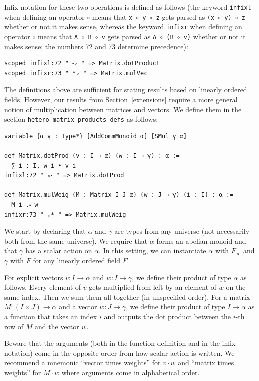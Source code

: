 \documentclass[]{article}
\renewcommand{\.}{\hskip .75pt}
\newcommand{\sekt}[1]{Section~\ref{#1}}
\let\r=\rightarrow
\let\*=\cdot
\begin{document}
Infix notation for these two operations is defined as follows
(the keyword \texttt{infixl} when defining an operator $\circ$ means that
\hbox{\texttt{x $\circ$ y $\circ$ z}} gets parsed as \texttt{(x $\circ$ y) $\circ$ z}
whether or not it makes sense, whereäs the keyword \texttt{infixr} when defining an operator $\circ$ means that %
\hbox{\texttt{A $\circ$ B $\circ$ v}} gets parsed as \texttt{A $\circ$ (B $\circ$ v)}
whether or not it makes sense; the numbers 72 and 73 determine precedence):
\begin{lstlisting}
scoped infixl:72 " ⬝ᵥ " => Matrix.dotProduct
scoped infixr:73 " *ᵥ " => Matrix.mulVec
\end{lstlisting}
The definitions above are sufficient for stating results based on linearly ordered fields.
However, our results from \sekt{extensions} require a more general notion of
multiplication between matrices and vectors.
We define them in the section \texttt{hetero\_matrix\_products\_defs}
as follows:
\begin{lstlisting}
variable {α γ : Type*} [AddCommMonoid α] [SMul γ α]

def Matrix.dotProd (v : I → α) (w : I → γ) : α :=
  ∑ i : I, w i • v i
infixl:72 " ᵥ⬝ " => Matrix.dotProd

def Matrix.mulWeig (M : Matrix I J α) (w : J → γ) (i : I) : α :=
  M i ᵥ⬝ w
infixr:73 " ₘ* " => Matrix.mulWeig
\end{lstlisting}
We start by declaring that $\alpha$ and $\gamma$ are types from
any universe (not necessarily both from the same universe).
We require that $\alpha$ forms an abelian monoid and that
$\gamma$ has a scalar action on $\alpha$. In this setting,
we can instantiate $\alpha$ with $F_\infty$ and $\gamma$
with $F$ for any linearly ordered field $F$.

For explicit vectors
$v : I \r \alpha$ and $w : I \r \gamma$, we define
their product of type $\alpha$ as follows.
Every element of $v$ gets multiplied from left by
an element of $w$ on the same index.
Then we sum them all together (in unspecified order).
For a matrix $M : (I \times J) \r \alpha$ and
a vector $w : J \r \gamma$, we define
their product of type $I \r \alpha$ as a function
that takes an index $i$ and outputs the dot product
between the $i$-th row of $M$ and the vector $w$.

Beware that the arguments (both in the function definition and
in the infix notation) come in the opposite order from how
scalar action is written. We recommend a mnemonic 
``vector times weights'' for $v \* w$ and
``matrix times weights'' for $M \* w$ where
arguments come in alphabetical order.
\end{document}
